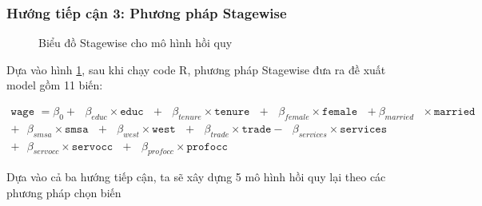 \subsubsection*{Hướng tiếp cận 3: Phương pháp Stagewise}
\begin{figure}[H]
	\centering
	 \hfill
	\caption{Biểu đồ Stagewise cho mô hình hồi quy}
	\label{stagewise}
\end{figure}

Dựa vào hình \ref{stagewise}, sau khi chạy code R, phương pháp Stagewise đưa ra đề xuất model gồm 11 biến:

\begin{equation*}
	\begin{multlined}
		\texttt{wage } = \beta_0 + \text{ } \beta_{educ}\times \texttt{educ} \text{ } + \text{ } \beta_{tenure} \times \texttt{tenure} \text{ }+\text{ }\beta_{female} \times \texttt{female} \text{ } 
		+ \beta_{married} \text{ } \times \texttt{married} \text{ } \\
		+\text{ }\beta_{smsa} \times\texttt{smsa}\text{ }  
		+ \text{ }\beta_{west} \times \texttt{west} \text{ } 
		+ \text{ }\beta_{trade}\times \texttt{trade} -\text{ }\beta_{services} \times \texttt{services} \text{ } \\
		+ \text{ }\beta_{servocc} \times \texttt{servocc} \text{ } + \text{ }\beta_{profocc}\times \texttt{profocc}
	\end{multlined}
\end{equation*}

Dựa vào cả ba hướng tiếp cận, ta sẽ xây dựng 5 mô hình hồi quy lại theo các phương pháp chọn biến

